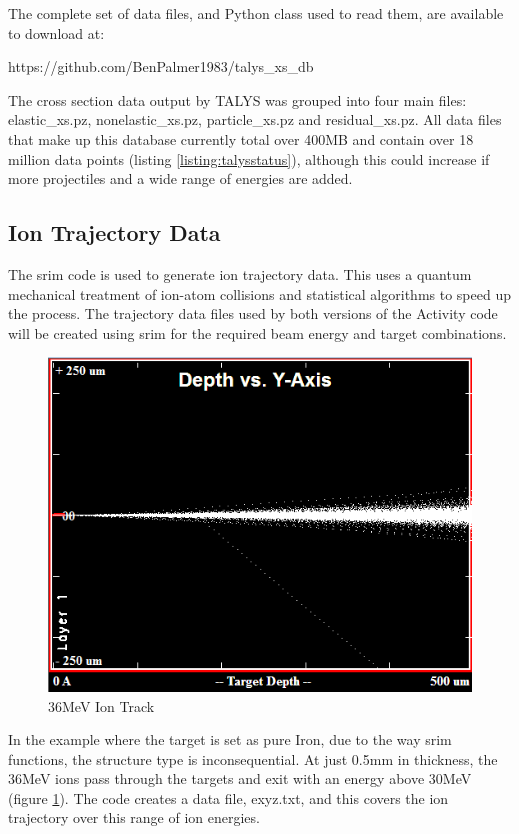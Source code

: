 The complete set of data files, and Python class used to read them, are available to download at:

https://github.com/BenPalmer1983/talys\_xs\_db 

The cross section data output by TALYS was grouped into four main files: elastic\_xs.pz, nonelastic\_xs.pz, particle\_xs.pz and residual\_xs.pz.  All data files that make up this database currently total over 400MB and contain over 18 million data points (listing \ref{listing:talysstatus}), although this could increase if more projectiles and a wide range of energies are added.





\FloatBarrier
\subsection{Ion Trajectory Data}

The \acrshort{srim} code is used to generate ion trajectory data.  This uses a quantum mechanical treatment of ion-atom collisions and statistical algorithms to speed up the process\cite{srimwebsite}.  The trajectory data files used by both versions of the Activity code will be created using \acrshort{srim} for the required beam energy and target combinations.

\begin{figure}[htb]
  \begin{center}
    \includegraphics[width=0.5\linewidth]{chapters/activity_code/images/ion_transport.png}
    \caption{36MeV Ion Track}
    \label{figure:36mevionsiniron}
  \end{center}
\end{figure}
In the example where the target is set as pure Iron, due to the way \acrshort{srim} functions, the structure type is inconsequential.  At just 0.5mm in thickness, the 36MeV ions pass through the targets and exit with an energy above 30MeV (figure \ref{figure:36mevionsiniron}).  The code creates a data file, exyz.txt, and this covers the ion trajectory over this range of ion energies.


